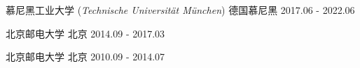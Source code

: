 



\begin{cventries}

{慕尼黑工业大学 (\textit{Technische Universität München})} %
{德国慕尼黑} %
{2017.06 - 2022.06} %


{北京邮电大学} %
{北京} %
{2014.09 - 2017.03} %


{北京邮电大学} %
{北京} %
{2010.09 - 2014.07} %

\end{cventries}
